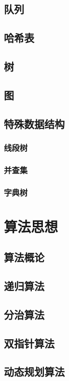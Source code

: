 \documentclass[UTF8]{ctexbook}
\begin{document}
        \section{队列}
        \section{哈希表}
        \section{树}
        \section{图}
        \section{特殊数据结构}
            \subsection{线段树}
            \subsection{并查集}
            \subsection{字典树}
    \newpage
    \chapter{算法思想}
        \section{算法概论}
        \section{递归算法}
        \section{分治算法}
        \section{双指针算法}
        \section{动态规划算法}
\end{document}
